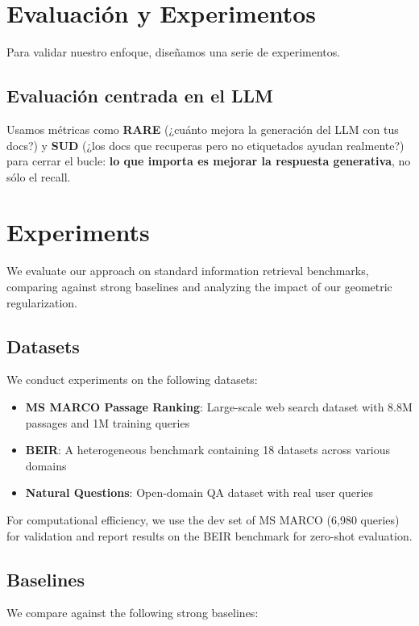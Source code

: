 \section{Evaluación y Experimentos}
Para validar nuestro enfoque, diseñamos una serie de experimentos.

\subsection{Evaluación centrada en el LLM}
Usamos métricas como \textbf{RARE} (¿cuánto mejora la generación del LLM con tus docs?) y \textbf{SUD} (¿los docs que recuperas pero no etiquetados ayudan realmente?) para cerrar el bucle: \textbf{lo que importa es mejorar la respuesta generativa}, no sólo el recall.

\section{Experiments}
\label{sec:experiments}

We evaluate our approach on standard information retrieval benchmarks, comparing against strong baselines and analyzing the impact of our geometric regularization.

\subsection{Datasets}

We conduct experiments on the following datasets:

\begin{itemize}
    \item \textbf{MS MARCO Passage Ranking}: Large-scale web search dataset with 8.8M passages and 1M training queries
    \item \textbf{BEIR}: A heterogeneous benchmark containing 18 datasets across various domains
    \item \textbf{Natural Questions}: Open-domain QA dataset with real user queries
\end{itemize}

For computational efficiency, we use the dev set of MS MARCO (6,980 queries) for validation and report results on the BEIR benchmark for zero-shot evaluation.

\subsection{Baselines}

We compare against the following strong baselines:

